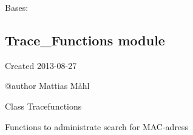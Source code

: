 \documentclass[letterpaper,10pt,english]{sphinxmanual}
\begin{document}

\begin{fulllineitems}
\label{Switch_Object:Switch_Object.sw_error}
Bases: 

\end{fulllineitems}



\subsection{Trace\_Functions module}
\label{Trace_Functions::doc}\label{Trace_Functions:module-Trace_Functions}\label{Trace_Functions:trace-functions-module}
Created 2013-08-27

@author Mattias Måhl

Class Tracefunctions

Functions to administrate search for MAC-adress
\end{document}
